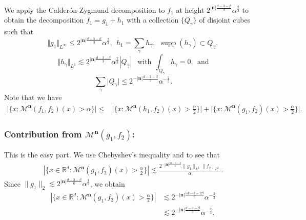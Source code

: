 \documentclass[a4paper,reqno]{amsart}
\numberwithin{equation}{section}
\begin{document}
	We apply the Calder\'{o}n-Zygmund decomposition to $f_1$ at height $2^{|\mathbf{n}|\frac{d-3-\beta}{3}}\alpha^{\frac{2}{3}}$ to obtain the decomposition $f_1=g_1+h_1$ with a collection $\{Q_{\gamma}\}$ of disjoint cubes such that  
	\[\Vert g_1\Vert_{L^{\infty}}\leq 2^{|\mathbf{n}|\frac{d-3-\beta}{3}}\alpha^{\frac{2}{3}}, ~~h_1=\sum_{\gamma}h_{\gamma},~~\operatorname{supp}(h_{\gamma})\subset Q_{\gamma},\]
	\[\Vert h_{\gamma}\Vert_{L^{1}}\lesssim 2^{|\mathbf{n}|\frac{d-3-\beta}{3}}\alpha^{\frac{2}{3}}|Q_{\gamma}|~~ \text{ with}~~ \int_{Q_{\gamma}}h_{\gamma}=0, ~~\text{and}\]
	\[\sum_{\gamma}\big|Q_{\gamma}\big|\leq 2^{-|\mathbf{n}|\frac{d-3-\beta}{3}}\alpha^{-\frac{2}{3}}.\]
	Note that we have
	\begin{align*}
		\Big|\{x:\mathcal{M}^{\mathbf{n}}(f_1,f_2)(x)>\alpha\}\Big|\leq&\Big|\{x:\mathcal{M}^{\mathbf{n}}(h_1,f_2)(x)>\frac{\alpha}{2}\}\Big|+\Big|\{x:\mathcal{M}^{\mathbf{n}}(g_1,f_2)(x)>\frac{\alpha}{2}\}\Big|.
	\end{align*}
	\subsubsection*{\bf Contribution from $\mathcal{M}^{\mathbf{n}}(g_1,f_2)$: }
	This is the easy part. We use Chebyshev's inequality and  to see that 
	\begin{align*}
		|\{x\in \mathbb{R}^{d}:\mathcal{M}^{\mathbf{n}}(g_1,f_2)(x)>\frac{\alpha}{2}\}|\lesssim \frac{2^{-|\mathbf{n}|\frac{2d-2-\beta}{2}}\|g_1\|_{L^2}\|f_2\|_{L^2}}{\alpha}.
	\end{align*}
	Since $\|g_1\|_2\lesssim2^{|\mathbf{n}|\frac{d-3-\beta}{6}}\alpha^{\frac{1}{3}}$, we obtain
	\begin{align*}
		|\{x\in \mathbb{R}^{d}:\mathcal{M}^{\mathbf{n}}(g_1,f_2)(x)>\frac{\alpha}{2}\}|&\lesssim 2^{-|\mathbf{n}|\frac{5d-3-2\beta}{6}}\alpha^{-\frac{2}{3}}\\
		&\lesssim2^{-|\mathbf{n}|\frac{d-3-\beta}{3}}\alpha^{-\frac{2}{3}}.
	\end{align*}
\end{document}

